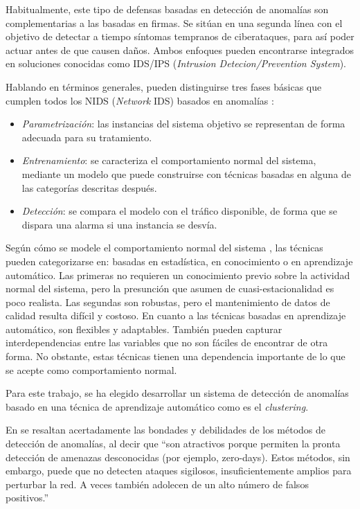 Habitualmente, este tipo de defensas basadas en detección de anomalías son complementarias a las basadas en firmas.
Se sitúan en una segunda línea con el objetivo de detectar a tiempo síntomas tempranos de ciberataques, para así poder actuar antes de que causen daños.
Ambos enfoques pueden encontrarse integrados en soluciones conocidas como IDS/IPS (\emph{Intrusion Detecion/Prevention System}).

Hablando en términos generales, pueden distinguirse tres fases básicas que cumplen todos los NIDS (\emph{Network} IDS) basados en anomalías \cite{GarciaTeodoro_2009}:
\begin{itemize}
    \item \emph{Parametrización}: las instancias del sistema objetivo se representan de forma adecuada para su tratamiento.
    \item \emph{Entrenamiento}: se caracteriza el comportamiento normal del sistema, mediante un modelo que puede construirse con técnicas basadas en alguna de las categorías descritas después.
    \item \emph{Detección}: se compara el modelo con el tráfico disponible, de forma que se dispara una alarma si una instancia se desvía.
\end{itemize}

Según cómo se modele el comportamiento normal del sistema \cite{Lazaveric_2005}, las técnicas pueden categorizarse en: basadas en estadística, en conocimiento o en aprendizaje automático.
Las primeras no requieren un conocimiento previo sobre la actividad normal del sistema, pero la presunción que asumen de cuasi-estacionalidad es poco realista.
Las segundas son robustas, pero el mantenimiento de datos de calidad resulta difícil y costoso.
En cuanto a las técnicas basadas en aprendizaje automático, son flexibles y adaptables.
También pueden capturar interdependencias entre las variables que no son fáciles de encontrar de otra forma.
No obstante, estas técnicas tienen una dependencia importante de lo que se acepte como comportamiento normal.

Para este trabajo, se ha elegido desarrollar un sistema de detección de anomalías basado en una técnica de aprendizaje automático como es el \emph{clustering}.

En \cite{Alconzo_2019} se resaltan acertadamente las bondades y debilidades de los métodos de detección de anomalías, al decir que ``son atractivos porque permiten la pronta detección de amenazas desconocidas (por ejemplo, zero-days).
Estos métodos, sin embargo, puede que no detecten ataques sigilosos, insuficientemente amplios para perturbar la red.
A veces también adolecen de un alto número de falsos positivos.''

